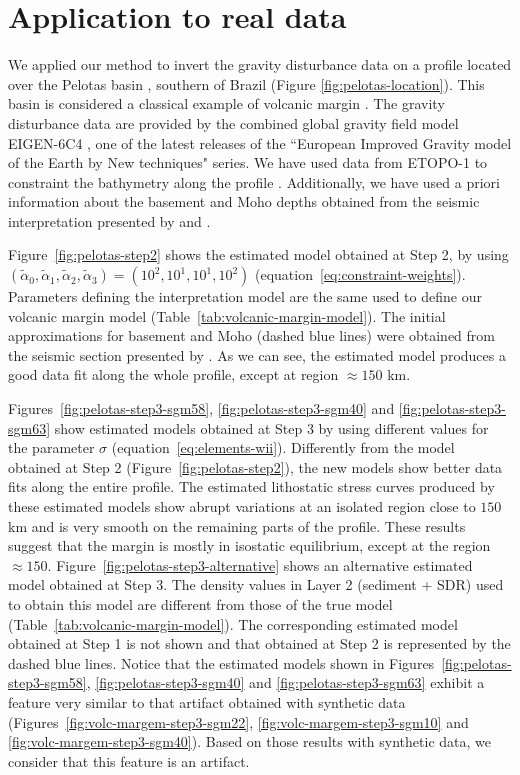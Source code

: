 \documentclass[manuscript]{geophysics}
\begin{document}
\section{Application to real data}

We applied our method to invert the gravity disturbance data 
on a profile located over the Pelotas basin
\citep{stica-etal2014}, southern of Brazil (Figure \ref{fig:pelotas-location}). This basin is 
considered a classical example of volcanic margin \citep{geoffroy2005}.
The gravity disturbance data are provided by the combined global gravity field model EIGEN-6C4
\citep{forste2014}, one of the latest releases of the ``European Improved Gravity model of 
the Earth by New techniques" series.
We have used data from ETOPO-1 to constraint the bathymetry along the profile
\citep{amante-eakins2009}.
Additionally, we have used a priori information about the basement and Moho depths
obtained from the seismic interpretation presented by \citet{stica-etal2014} and
\citet{zalan2015}.

Figure~\ref{fig:pelotas-step2} shows the estimated model obtained at Step 2,
by using $(\tilde{\alpha}_{0}, \tilde{\alpha}_{1}, \tilde{\alpha}_{2}, \tilde{\alpha}_{3}) 
= (10^{2}, 10^{1}, 10^{1}, 10^{2})$ (equation~\ref{eq:constraint-weights}).
Parameters defining the interpretation model are the same used
to define our volcanic margin model (Table~\ref{tab:volcanic-margin-model}).
The initial approximations for basement and Moho (dashed blue lines) were obtained from
the seismic section presented by \citet{stica-etal2014}.
As we can see, the estimated model produces a good data fit along the whole
profile, except at region $\approx 150$ km.

Figures~\ref{fig:pelotas-step3-sgm58}, \ref{fig:pelotas-step3-sgm40} and 
\ref{fig:pelotas-step3-sgm63} show estimated models obtained at
Step 3 by using different values for the parameter $\sigma$
(equation~\ref{eq:elements-wii}).
Differently from the model obtained at Step 2 (Figure~\ref{fig:pelotas-step2}), 
the new models show better data fits along the entire profile.
The estimated lithostatic stress curves produced by these estimated models 
show abrupt variations at an isolated region close to $150$ km and is very smooth on the remaining parts
of the profile. These results suggest that the margin is mostly in isostatic 
equilibrium, except at the region $\approx 150$.
Figure~\ref{fig:pelotas-step3-alternative} shows an alternative 
estimated model obtained at Step 3.
The density values in Layer 2 (sediment + SDR) used to obtain this model 
are different from those of the true model (Table~\ref{tab:volcanic-margin-model}).
The corresponding estimated model obtained at Step 1 is not shown and
that obtained at Step 2 is represented by the dashed blue lines.
Notice that the estimated models shown in Figures~\ref{fig:pelotas-step3-sgm58}, 
\ref{fig:pelotas-step3-sgm40} and \ref{fig:pelotas-step3-sgm63} exhibit a feature
very similar to that artifact obtained with synthetic data 
(Figures~\ref{fig:volc-margem-step3-sgm22}, \ref{fig:volc-margem-step3-sgm10} and 
\ref{fig:volc-margem-step3-sgm40}). Based on those results with synthetic data, 
we consider that this feature is an artifact.
\end{document}
